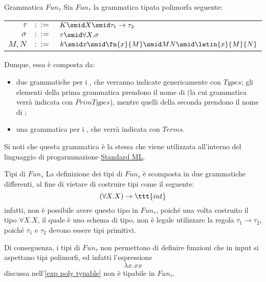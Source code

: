 \documentclass[a4paper, 12pt]{report}
\begin{document}
    \begin{frameddefn}{Grammatica $Fun_\tau$}
        Sia $Fun_\tau$ la grammatica tipata polimorfa seguente:

        \begin{center}
            \begin{tabular}{rcl}
                $\tau$ & $::=$ & $K \smid X \smid \tau_1 \to \tau_2$ \\
                $\sigma$ & $::=$ & $\tau \smid \forall X.\sigma$ \\
                $M, N$ & $::=$ & $k \smid x \smid \fn{x}{M} \smid MN \smid \letin{x}{M}{N}$ \\
            \end{tabular}
        \end{center}

        Dunque, essa è composta da:

        \begin{itemize}
            \item due grammatiche per i , che verranno indicate genericamente con $Types$; gli elementi della prima grammatica prendono il nome di  (la cui grammatica verrà indicata con $PrimTypes$), mentre quelli della seconda prendono il nome di ;
            \item una grammatica per i , che verrà indicata con $Terms$.
        \end{itemize}

        Si noti che questa grammatica è la stessa che viene utilizzata all'interno del linguaggio di progarmmazione \href{https://it.wikipedia.org/wiki/Standard_ML}{Standard ML}.
    \end{frameddefn}

    \begin{framedobs}{Tipi di $Fun_\tau$}
        La definizione dei tipi di $Fun_\tau$ è scomposta in due grammatiche differenti, al fine di vietare di costruire tipi come il seguente: $$(\forall X.X )\to \ttt{int}$$ infatti, non è possibile avere questo tipo in $Fun_\tau$, poiché una volta costruito il tipo $\forall X.X$, il quale è uno schema di tipo, non è legale utilizzare la regola $\tau_1 \to \tau_2$, poiché $\tau_1$ e $\tau_2$ devono essere tipi primitivi.

        Di conseguenza, i tipi di $Fun_\tau$ non permettono di definire funzioni che in input si aspettano tipi polimorfi, ed infatti l'espressione $$\lambda x.xx$$ discussa nell'\cref{exp poly typable} non è tipabile in $Fun_\tau$.
    \end{framedobs}
\end{document}
